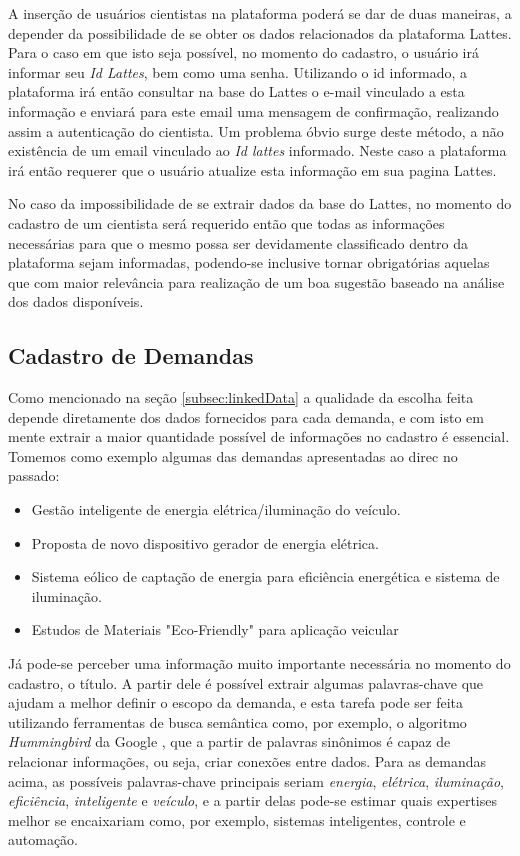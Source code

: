 A inserção de usuários cientistas na plataforma poderá se dar de duas maneiras, a depender da possibilidade de se obter os dados relacionados da plataforma Lattes. Para o caso em que isto seja possível, no momento do cadastro, o usuário irá informar seu \textit{Id Lattes}, bem como uma senha. Utilizando o id informado, a plataforma irá então consultar na base do Lattes o e-mail vinculado a esta informação e enviará para este email uma mensagem de confirmação, realizando assim a autenticação do cientista. Um problema óbvio surge deste método, a não existência de um email vinculado ao \textit{Id lattes} informado. Neste caso a plataforma irá então requerer que o usuário atualize esta informação em sua pagina Lattes.

No caso da impossibilidade de se extrair dados da base do Lattes, no momento do cadastro de um cientista será requerido então que todas as informações necessárias para que o mesmo possa ser devidamente classificado dentro da plataforma sejam informadas, podendo-se inclusive tornar obrigatórias aquelas que com maior relevância para realização de um boa sugestão baseado na análise dos dados disponíveis.  

\subsection{Cadastro de Demandas}\label{subsec:demandas}

Como mencionado na seção \ref{subsec:linkedData} a qualidade da escolha feita depende diretamente dos dados fornecidos para cada demanda, e com isto em mente extrair a maior quantidade possível de informações no cadastro é essencial. Tomemos como exemplo algumas das demandas apresentadas ao \gls{direc} no passado:

\begin{itemize}
    \item Gestão inteligente de energia elétrica/iluminação do veículo.
    \item Proposta de novo dispositivo gerador de energia elétrica.
    \item Sistema eólico de captação de energia para eficiência energética e sistema de iluminação.
    \item Estudos de Materiais "Eco-Friendly" para aplicação veicular
\end{itemize}

Já pode-se perceber uma informação muito importante necessária no momento do cadastro, o título. A partir dele é possível extrair algumas palavras-chave que ajudam a melhor definir o escopo da demanda, e esta tarefa pode ser feita utilizando ferramentas de busca semântica como, por exemplo, o algoritmo \textit{Hummingbird} da Google \cite{Hummingbird}, que a partir de palavras sinônimos é capaz de relacionar informações, ou seja, criar conexões entre dados. Para as demandas acima, as possíveis palavras-chave principais seriam \textit{energia}, \textit{elétrica}, \textit{iluminação}, \textit{eficiência}, \textit{inteligente} e \textit{veículo}, e a partir delas pode-se estimar quais expertises melhor se encaixariam como, por exemplo, sistemas inteligentes, controle e automação.

